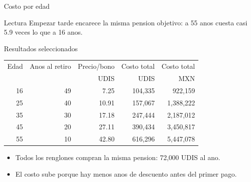 \documentclass[aspectratio=169,11pt]{beamer}
\newcommand{\udis}{\textsc{UDIS}}
\newcommand{\mxn}{\textsc{MXN}}
\begin{document}
\begin{frame}{Costo por edad}
  \begin{center}
  \end{center}
  \vspace{-0.15cm}
  \begin{block}{Lectura}
    Empezar tarde encarece la misma pension objetivo: a 55 anos cuesta casi 5.9 veces lo que a 16 anos.
  \end{block}
\end{frame}

\begin{frame}{Resultados seleccionados}
  \begin{table}
  \centering
  \small
  \begin{tabular}{rrrrr}
    \toprule
    Edad & Anos al retiro & Precio/bono & Costo total & Costo total \\
    & & \udis & \udis & \mxn \\
    \midrule
    16 & 49 & 7.25 & 104,335 & 922,159 \\
    25 & 40 & 10.91 & 157,067 & 1,388,222 \\
    35 & 30 & 17.18 & 247,444 & 2,187,012 \\
    45 & 20 & 27.11 & 390,434 & 3,450,817 \\
    55 & 10 & 42.80 & 616,296 & 5,447,078 \\
    \bottomrule
  \end{tabular}
  \end{table}
  \begin{itemize}
    \item Todos los renglones compran la misma pension: 72,000 \udis{} al ano.
    \item El costo sube porque hay menos anos de descuento antes del primer pago.
  \end{itemize}
\end{frame}
\end{document}
